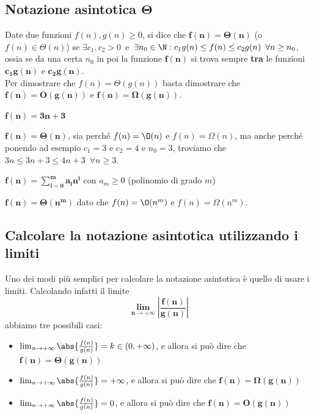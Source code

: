 \documentclass[11pt, a4paper, titlepage, oneside]{scrbook}
\begin{document}
\subsection{Notazione asintotica \texorpdfstring{$\bm{\Theta}$}{}}

\begin{Definizione}
\label{def-notazione-asintotica-Theta}
Date due funzioni $f(n), g(n) \geq 0$, si dice che $\bm{f(n) = \Theta(n)}$ (o $f(n) \in \Theta(n)$) se \mbox{$\exists c_1,c_2 > 0$ e $\exists n_0 \in \N: c_1 g(n) \leq f(n) \leq c_2 g(n) \enspace \forall n \geq n_0$}, ossia se da una certa $n_0$ in poi la funzione $\bm{f(n)}$ si trova sempre \textbf{tra} le funzioni $\bm{c_1g(n)}$ e $\bm{c_2 g(n)}$. \\
\NB Per dimostrare che $f(n) = \Theta(g(n))$ basta dimostrare che $\bm{f(n) = \textbf{O}(g(n))}$ e $\bm{f(n) = \Omega(g(n))}$.
\end{Definizione}

\Esempi \nopagebreak

$\bm{f(n) = 3n + 3}$ \nopagebreak

$\bm{f(n) = \Theta(n)}$, sia perché $f(n) = \O(n)$ e $f(n) = \Omega(n)$, ma anche perché ponendo ad esempio $c_1 = 3$ e $c_2 = 4$ e $n_0 = 3$, troviamo che \mbox{$3n \leq 3n + 3 \leq 4n + 3 \enspace \forall n \geq 3$}.

\Separatore

$\bm{f(n) = \sum_{i = 0}^m a_i n^i}$ con $a_m \geq 0$ (polinomio di grado $m$) \nopagebreak

$\bm{f(n) = \Theta(n^m)}$ dato che $f(n) = \O(n^m)$ e $f(n) = \Omega(n^m)$.

\subsection{Calcolare la notazione asintotica utilizzando i limiti}

Uno dei modi più semplici per calcolare la notazione asintotica è quello di usare i limiti. Calcolando infatti il limite
\[
\bm{\lim_{n \to +\infty} \left| \frac{f(n)}{g(n)} \right|}
\]
abbiamo tre possibili casi:
\begin{itemize}
    \item $\lim_{n \to +\infty} \abs{\frac{f(n)}{g(n)}} = k \in (0, +\infty)$, e allora si può dire che $\bm{f(n) = \Theta(g(n))}$
    \item $\lim_{n \to +\infty} \abs{\frac{f(n)}{g(n)}} = +\infty$, e allora si può dire che $\bm{f(n) = \Omega(g(n))}$
    \item $\lim_{n \to +\infty} \abs{\frac{f(n)}{g(n)}} = 0$, e allora si può dire che $\bm{f(n) = \textbf{O}(g(n))}$
\end{itemize}
\end{document}
